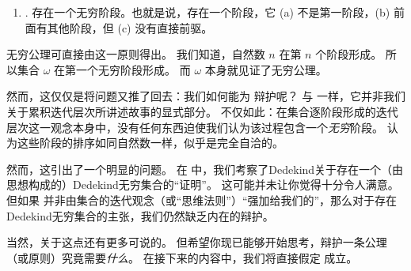 \documentclass[../../../include/open-logic-section]{subfiles}
\begin{document}
\begin{enumerate}
	\item[] \stagesinf. 存在一个无穷阶段。也就是说，存在一个阶段，它 (a) 不是第一阶段，(b) 前面有其他阶段，但 (c) 没有直接前驱。
\end{enumerate}

无穷公理可直接由这一原则得出。
我们知道，自然数 $n$ 在第 $n$ 个阶段形成。
所以集合 $\omega$ 在第一个无穷阶段形成。
而 $\omega$ 本身就见证了无穷公理。

然而，这仅仅是将问题又推了回去：我们如何能为 \stagesinf 辩护呢？
与 \stagessucc 一样，它并非我们关于累积迭代层次所讲述故事的显式部分。
不仅如此：在集合逐阶段形成的迭代层次这一观念本身中，没有任何东西迫使我们认为该过程包含一个\emph{无穷}阶段。
认为这些阶段的排序如同自然数一样，似乎是完全自洽的。

然而，这引出了一个明显的问题。
在  中，我们考察了Dedekind关于存在一个（由思想构成的）Dedekind无穷集合的“证明”。
这可能并未让你觉得十分令人满意。
但如果 \stagesinf 并非由集合的迭代观念（或“思维法则”）“强加给我们的”，那么对于存在Dedekind无穷集合的主张，我们仍然缺乏内在的辩护。

当然，关于这点还有更多可说的。
但希望你现已能够开始思考，辩护一条公理（或原则）究竟需要\emph{什么}。
在接下来的内容中，我们将直接假定 \stagesinf{} 成立。
\end{document}
